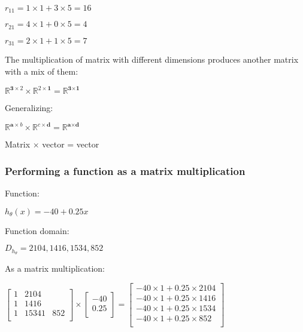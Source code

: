 \documentclass[a4paper]{report}
\begin{document}
        $r_{11} = 1 \times 1 + 3 \times 5 = 16$
        
        $r_{21} = 4 \times 1 + 0 \times 5 = 4$

        $r_{31} = 2 \times 1 + 1 \times 5 = 7$

        The multiplication of matrix with different dimensions produces another matrix with a mix of them:

        $\mathbb{R}^{\textbf{3} \times 2} \times \mathbb{R}^{2 \times \textbf{1}} = \mathbb{R}^{\textbf{3} \times \textbf{1}}$

        Generalizing:

        $\mathbb{R}^{\textbf{a} \times b} \times \mathbb{R}^{c \times \textbf{d}} = \mathbb{R}^{\textbf{a} \times \textbf{d}}$

        Matrix $\times$ vector = vector

        \subsubsection{Performing a function as a matrix multiplication}

          Function:

          $h_{\theta}(x) = -40 + 0.25x$

          Function domain:

          $D_{h_{\theta}} = {2104, 1416, 1534, 852}$

          As a matrix multiplication:

          $\begin{bmatrix}
            1 & 2104 \\
            1 & 1416 \\
            1 & 1534
            1 & 852 \\
          \end{bmatrix}
          \times
          \begin{bmatrix}
            -40 \\
            0.25 \\
          \end{bmatrix}
          =
          \begin{bmatrix}
            -40 \times 1 + 0.25 \times 2104 \\
            -40 \times 1 + 0.25 \times 1416 \\
            -40 \times 1 + 0.25 \times 1534 \\
            -40 \times 1 + 0.25 \times 852 \\
          \end{bmatrix}$
\end{document}
